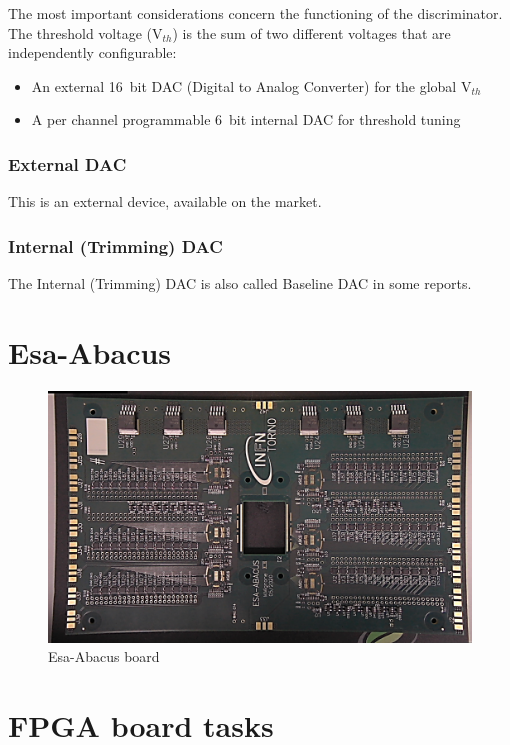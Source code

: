 \noindent The most important considerations concern the functioning of the discriminator.
The threshold voltage (V$_{th}$) is the sum of two different voltages that are independently configurable:
\begin{itemize}
	\item An external 16~bit DAC (Digital to Analog Converter) for the global V$_{th}$ 
	\item A per channel programmable 6~bit internal DAC for threshold tuning
\end{itemize}

\subsubsection{External DAC}
This is an external device, available on the market.

\subsubsection{Internal (Trimming) DAC}
The Internal (Trimming) DAC is also called Baseline DAC in some reports.

\section{Esa-Abacus}\label{esaabacus}
\begin{figure}[H]
	\centering
	\includegraphics[width=0.7\linewidth]{IMG/ch2/EsaAbacus.png}
	\caption{Esa-Abacus board}
	\label{fig:esaabacus}
\end{figure}

\section{FPGA board tasks}
